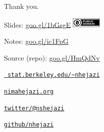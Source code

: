\documentclass[12pt,t]{beamer}
\begin{document}
\begin{frame}[c]{Thank you.}

\Large
Slides: \href{https://goo.gl/1bGsgE}{goo.gl/1bGsgE} \quad
\includegraphics[height=5mm]{Figs/cc-zero.png}

\vspace{3mm}
Notes: \href{https://goo.gl/ic1FpG}{goo.gl/ic1FpG}

\vspace{3mm}
Source (repo): \href{https://goo.gl/HmQdNv}{goo.gl/HmQdNv}

\vspace{3mm}
\href{https://www.stat.berkeley.edu/~nhejazi}{\tt
  stat.berkeley.edu/\textasciitilde{}nhejazi}

\vspace{3mm}
\href{http://nimahejazi.org}{\tt nimahejazi.org}

\vspace{3mm}
\href{https://twitter.com/nshejazi}{\tt twitter/@nshejazi}

\vspace{3mm}
\href{https://github.com/nhejazi}{\tt github/nhejazi}


\end{frame}

\end{document}
